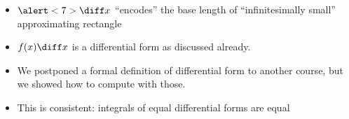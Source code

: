 \begin{frame}
\begin{itemize}
\item<7-> $\alert<7>{\diff x}$ ``encodes''  \alert<3>{the base length} of ``\alert<5>{infinitesimally small}'' approximating rectangle
\item<9-> $f(x) \diff x$ is a differential form as discussed already.
\item<10-> We postponed a formal definition of differential form to another course, but we showed how to compute with those. 
\item<11-> \alert<11>{This is consistent:} \alert<12>{integrals of equal differential forms are equal} 
\end{itemize}
\end{frame}

